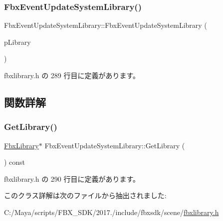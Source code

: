 \subsubsection{\texorpdfstring{Fbx\+Event\+Update\+System\+Library()}{FbxEventUpdateSystemLibrary()}}
{\footnotesize\ttfamily Fbx\+Event\+Update\+System\+Library\+::\+Fbx\+Event\+Update\+System\+Library (\begin{DoxyParamCaption}\item[{\hyperlink{class_fbx_library}{Fbx\+Library} $\ast$}]{p\+Library }\end{DoxyParamCaption})\hspace{0.3cm}{\ttfamily [inline]}}



 fbxlibrary.\+h の 289 行目に定義があります。



\subsection{関数詳解}
\mbox{\label{class_fbx_event_update_system_library_a216f7eb4fed21eeac1aa0398fb164288}} 
\subsubsection{\texorpdfstring{Get\+Library()}{GetLibrary()}}
{\footnotesize\ttfamily \hyperlink{class_fbx_library}{Fbx\+Library}$\ast$ Fbx\+Event\+Update\+System\+Library\+::\+Get\+Library (\begin{DoxyParamCaption}{ }\end{DoxyParamCaption}) const\hspace{0.3cm}{\ttfamily [inline]}}



 fbxlibrary.\+h の 290 行目に定義があります。



このクラス詳解は次のファイルから抽出されました\+:\begin{DoxyCompactItemize}
\item 
C\+:/\+Maya/scripts/\+F\+B\+X\+\_\+\+S\+D\+K/2017./include/fbxsdk/scene/\hyperlink{fbxlibrary_8h}{fbxlibrary.\+h}\end{DoxyCompactItemize}
